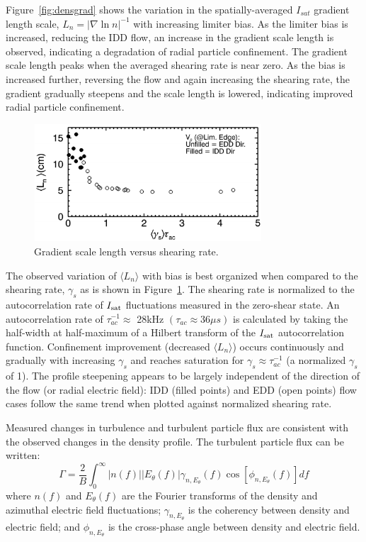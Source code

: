 \documentclass[aps,prl,amsmath,amssymb,preprint,superscriptaddress]{revtex4}
\begin{document}
Figure~\ref{fig:densgrad} shows the variation in the spatially-averaged $I_{sat}$ gradient length scale, $L_{n} = \lvert \nabla \ln n \rvert ^{-1}$ with
increasing limiter bias.  As the limiter bias is increased, reducing
the IDD flow, an increase in the gradient scale length is observed,
indicating a degradation of radial particle confinement. The gradient scale length peaks
when the averaged shearing rate is near zero. As the bias is
increased further, reversing the flow and again increasing the
shearing rate, the gradient gradually steepens and the
scale length is lowered, indicating improved radial particle confinement.  

\begin{figure}[!htbp]
\centerline{
\includegraphics[width=8.5cm]{shearandgrad}}
\caption{\label{fig:shearandgrad} Gradient scale length versus
  shearing rate.}
\end{figure}

The observed variation of $\langle L_{n} \rangle$ with bias is best
organized when compared to the shearing rate, $\gamma_{s}$ as is
shown in Figure~\ref{fig:shearandgrad}.   The shearing rate is
normalized to the autocorrelation rate of $I_{\rm sat}$ fluctuations
measured in the zero-shear state.  An autocorrelation rate of $\tau_{ac}^{-1} \approx $ 28kHz $(\tau_{ac} \approx 36\mu s)$ is calculated by taking the half-width at
half-maximum of a Hilbert transform of the $I_{\rm sat}$
autocorrelation function.  Confinement improvement (decreased $\langle
L_n \rangle$) occurs continuously and gradually with increasing
$\gamma_{s}$ and reaches saturation for $\gamma_{s} \approx \tau_{ac}^{-1}$ (a normalized $\gamma_{s}$ of 1).  The profile steepening
appears to be largely independent of the direction of the flow (or radial electric field): IDD (filled points) and EDD (open points) flow cases follow the same trend when plotted against normalized shearing rate.

Measured changes in turbulence and turbulent particle flux are
consistent with the observed changes in the density profile.  The
turbulent particle flux can be written\cite{powers74}:
\begin{equation}
\Gamma = \frac{2}{B} \int^{\infty}_{0} \lvert n(f) \rvert \lvert E_{\theta}(f) \rvert \gamma_{n,E_{\theta}}(f) \cos [\phi_{n,E_{\theta}}(f)] df
\label{eq:fluxint}
\end{equation}
where $n(f)$ and $E_\theta(f)$ are the Fourier transforms of
the density and azimuthal electric field fluctuations;
$\gamma_{n,E_\theta}$ is the coherency between density and electric
field; and $\phi_{n,E_\theta}$ is the cross-phase angle between
density and electric field.
\end{document}

